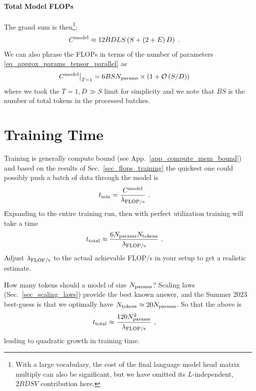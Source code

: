 \documentclass[11pt]{article}
\begin{document}
\paragraph{Total Model FLOPs}


The grand sum is then\footnote{With a large vocabulary, the cost of the final language model head
	matrix multiply can also be significant, but we have omitted its $ L $-independent,  $ 2BDSV $
	contribution here. }:
\begin{align}
	C  ^{ {\rm  model}  } & \approx 12 BDLS \left ( S + \left ( 2+E \right )D \right ) \label{eq_model_flops}\ .
\end{align}
We can also phrase the FLOPs in terms of the number of parameters \eqref{eq_approx_params_tensor_parallel} as
\begin{align}
	C  ^{ {\rm  model}  } \big| _{ T=1 } & = 6BS N _{ {\rm  params}  }\times \left ( 1 + \mathcal{O} \left( S/D\right)  \right )
\end{align}
where we took the $ T=1, D \gg S $ limit for simplicity and we note that $ BS $  is the number of
total tokens in the processed batches.


\section{Training Time \label{sec_train_time} }



Training is generally compute bound (see App.~\ref{app_compute_mem_bound}) and based on the results
of Sec.~\ref{sec_flops_training} the quickest one could possibly push a batch of data through the
model is
\begin{align}
	t _{ {\rm  min} } & = \frac{ C  ^{ {\rm  model}  }  }{   \lambda _{ {\rm FLOP/s} } }\ . \label{eq_tmin_model}
\end{align}
Expanding to the entire training run, then with perfect utilization training will take a time
\begin{align}
	t _{ {\rm  total} } & \approx  \frac{6N _{ {\rm params} } N _{ {\rm tokens} }}{   \lambda _{ {\rm FLOP/s} } }\ . \label{eq_training_rule_of_thumb}
\end{align}
Adjust $ \lambda _{ {\rm FLOP/s} } $ to the actual achievable FLOP/s in your setup to get a realistic estimate.

How many tokens should a model of size $ N _{ {\rm params} } $? Scaling laws (Sec.~\ref{sec_scaling_laws}) provide
the best known answer, and the Summer 2023 best-guess is that we optimally have $ N _{ {\rm tokens} }\approx 20 N _{ {\rm params} } $.
So that the above is
\begin{align}
	t _{ {\rm  total} } & \approx  \frac{120N _{ {\rm params} } ^{ 2 }}{   \lambda _{ {\rm FLOP/s} } }\ ,
\end{align}
leading to quadratic growth in training time.
\end{document}
